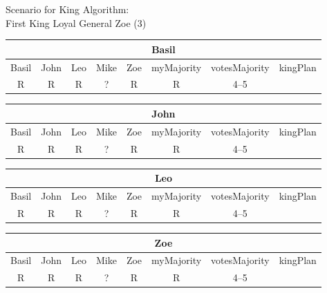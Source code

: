\begin{wideslide}[bm=,toc=]{\large Scenario for King Algorithm:\\First King Loyal General Zoe (3)}
\vspace*{2ex}
\begin{center}
\begin{paenv}

\begin{tabular}{|c|c|c|c|c||c|c|c|}
\hline
\multicolumn{8}{|c|}{Basil}\\\hline
Basil & John & Leo & Mike & Zoe & myMajority & votesMajority & kingPlan \\\hline
R&R&R&?&R&R&4--5&\\\hline
\end{tabular}
\smallskip

\begin{tabular}{|c|c|c|c|c||c|c|c|}
\hline
\multicolumn{8}{|c|}{John}\\\hline
Basil & John & Leo & Mike & Zoe & myMajority & votesMajority & kingPlan \\\hline
R&R&R&?&R&R&4--5&\\\hline
\end{tabular}
\smallskip

\begin{tabular}{|c|c|c|c|c||c|c|c|}
\hline
\multicolumn{8}{|c|}{Leo}\\\hline
Basil & John & Leo & Mike & Zoe & myMajority & votesMajority & kingPlan \\\hline
R&R&R&?&R&R&4--5&\\\hline
\end{tabular}
\smallskip

\begin{tabular}{|c|c|c|c|c||c|c|c|}
\hline
\multicolumn{8}{|c|}{Zoe}\\\hline
Basil & John & Leo & Mike & Zoe & myMajority & votesMajority & kingPlan \\\hline
R&R&R&?&R&R&4--5&\\\hline
\end{tabular}
\end{paenv}
\end{center}
\end{wideslide}

